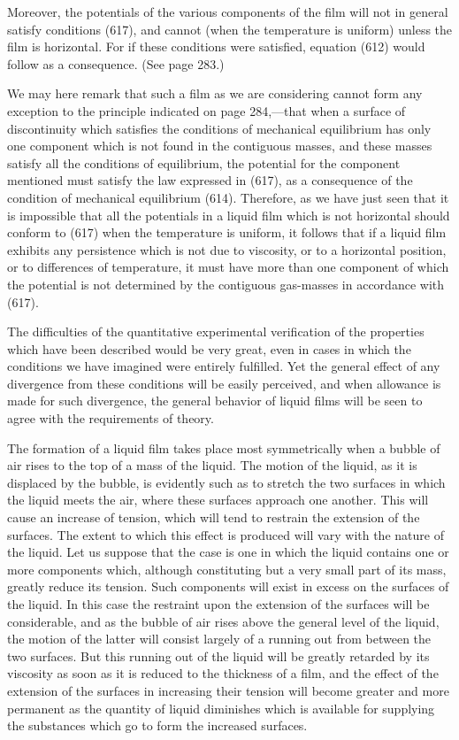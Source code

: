 \documentclass[12pt]{memoir}
\begin{document}
Moreover, the potentials of the various components of the film will not in general satisfy conditions (617), and cannot (when the temperature is uniform) unless the film is horizontal. For if these conditions were satisfied, equation (612) would follow as a consequence. (See page 283.)

We may here remark that such a film as we are considering cannot form any exception to the principle indicated on page 284,---that when a surface of discontinuity which satisfies the conditions of mechanical equilibrium has only one component which is not found in the contiguous masses, and these masses satisfy all the conditions of equilibrium, the potential for the component mentioned must satisfy the law expressed in (617), as a consequence of the condition of mechanical equilibrium (614). Therefore, as we have just seen that it is impossible that all the potentials in a liquid film which is not horizontal should conform to (617) when the temperature is uniform, it follows that if a liquid film exhibits any persistence which is not due to viscosity, or to a horizontal position, or to differences of temperature, it must have more than one component of which the potential is not determined by the contiguous gas-masses in accordance with (617).

The difficulties of the quantitative experimental verification of the properties which have been described would be very great, even in cases in which the conditions we have imagined were entirely fulfilled. Yet the general effect of any divergence from these conditions will be easily perceived, and when allowance is made for such divergence, the general behavior of liquid films will be seen to agree with the requirements of theory.

The formation of a liquid film takes place most symmetrically when a bubble of air rises to the top of a mass of the liquid. The motion of the liquid, as it is displaced by the bubble, is evidently such as to stretch the two surfaces in which the liquid meets the air, where these surfaces approach one another. This will cause an increase of tension, which will tend to restrain the extension of the surfaces. The extent to which this effect is produced will vary with the nature of the liquid. Let us suppose that the case is one in which the liquid contains one or more components which, although constituting but a very small part of its mass, greatly reduce its tension. Such components will exist in excess on the surfaces of the liquid. In this case the restraint upon the extension of the surfaces will be considerable, and as the bubble of air rises above the general level of the liquid, the motion of the latter will consist largely of a running out from between the two surfaces. But this running out of the liquid will be greatly retarded by its viscosity as soon as it is reduced to the thickness of a film, and the effect of the extension of the surfaces in increasing their tension will become greater and more permanent as the quantity of liquid diminishes which is available for supplying the substances which go to form the increased surfaces.
\end{document}
